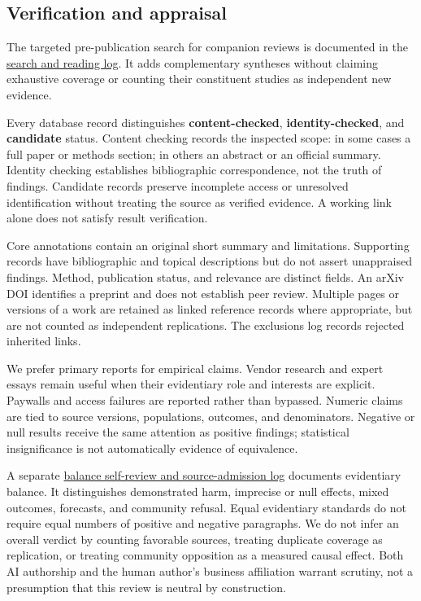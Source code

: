 \subsection*{Verification and appraisal}
The targeted pre-publication search for companion reviews is documented in the \href{https://does-ai-help.github.io/downloads/does-ai-help-related-reviews-2026.10.15.md}{search and reading log}. It adds complementary syntheses without claiming exhaustive coverage or counting their constituent studies as independent new evidence.


Every database record distinguishes \textbf{content-checked}, \textbf{identity-checked}, and \textbf{candidate} status. Content checking records the inspected scope: in some cases a full paper or methods section; in others an abstract or an official summary. Identity checking establishes bibliographic correspondence, not the truth of findings. Candidate records preserve incomplete access or unresolved identification without treating the source as verified evidence. A working link alone does not satisfy result verification.


Core annotations contain an original short summary and limitations. Supporting records have bibliographic and topical descriptions but do not assert unappraised findings. Method, publication status, and relevance are distinct fields. An arXiv DOI identifies a preprint and does not establish peer review. Multiple pages or versions of a work are retained as linked reference records where appropriate, but are not counted as independent replications. The exclusions log records rejected inherited links.


We prefer primary reports for empirical claims. Vendor research and expert essays remain useful when their evidentiary role and interests are explicit. Paywalls and access failures are reported rather than bypassed. Numeric claims are tied to source versions, populations, outcomes, and denominators. Negative or null results receive the same attention as positive findings; statistical insignificance is not automatically evidence of equivalence.


A separate \href{https://does-ai-help.github.io/downloads/does-ai-help-balance-review-2026.10.15.md}{balance self-review and source-admission log} documents evidentiary balance. It distinguishes demonstrated harm, imprecise or null effects, mixed outcomes, forecasts, and community refusal. Equal evidentiary standards do not require equal numbers of positive and negative paragraphs. We do not infer an overall verdict by counting favorable sources, treating duplicate coverage as replication, or treating community opposition as a measured causal effect. Both AI authorship and the human author's business affiliation warrant scrutiny, not a presumption that this review is neutral by construction.


